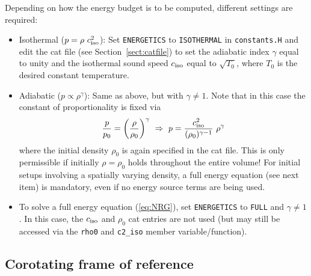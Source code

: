 Depending on how the energy budget is to be computed, different
settings are required:
\begin{itemize}
\item Isothermal ($p = \rho \ c_{\rm iso}^2$): Set {\tt ENERGETICS} to
  {\tt ISOTHERMAL} in {\tt constants.H} and edit the cat file (see
  Section~\ref{sect:catfile}) to set the adiabatic index $\gamma$ equal
  to unity and the isothermal sound speed $c_{\rm iso}$ equal to
  \mbox{$\sqrt{T_0}$}, where $T_0$ is the desired constant temperature.
\item Adiabatic ($p \propto \rho^{\gamma}$): Same as above, but with
  \mbox{$\gamma \ne 1$}. Note that in this case the constant of
  proportionality is fixed via
  \begin{equation}
    \frac{p}{p_0} = \left(\frac{\rho}{\rho_0}\right)^{\gamma}
    \ \Rightarrow \
    p = \frac{c_{\rm iso}^2}{(\rho_0)^{\gamma-1}} \ \rho^{\gamma}
  \end{equation}
  where the initial density $\rho_0$ is again specified in the cat file.
  This is only permissible if initially $\rho=\rho_0$ holds throughout the
  entire volume! For initial setups involving a spatially varying density,
  a full energy equation (see next item) is mandatory, even if no energy
  source terms are being used.
\item To solve a full energy equation (\ref{eq:NRG}), set {\tt ENERGETICS}
  to {\tt FULL} and $\gamma \ne 1$. In this case, the $c_{\rm iso}$ and
  $\rho_0$ cat entries are not used (but may still be accessed via the
  {\tt rho0} and {\tt c2\_iso} member variable/function).
\end{itemize}

\subsection{Corotating frame of reference}
\label{sect:corotation}

